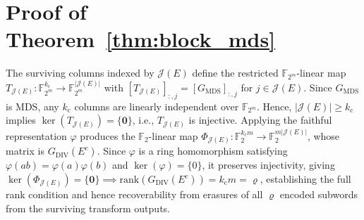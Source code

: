 \documentclass[journal]{IEEEtran}
\begin{document}
\section{Proof of Theorem~\ref{thm:block_mds}}
\label{app:proof_block_mds}
The surviving columns indexed by $\mathcal{J}(E)$ define the restricted $\mathbb{F}_{2^m}$-linear map $T_{\mathcal{J}(E)}:\mathbb{F}_{2^m}^{k_{\mathrm{c}}}\rightarrow\mathbb{F}_{2^m}^{|\mathcal{J}(E)|}$ with $[T_{\mathcal{J}(E)}]_{:,j}=[G_{\mathrm{MDS}}]_{:,j}$ for $j\in\mathcal{J}(E)$. Since $G_{\mathrm{MDS}}$ is MDS, any $k_{\mathrm{c}}$ columns are linearly independent over $\mathbb{F}_{2^m}$. Hence, $|\mathcal{J}(E)|\geq k_{\mathrm{c}}$ implies $\ker(T_{\mathcal{J}(E)})=\{\mathbf{0}\}$, i.e., $T_{\mathcal{J}(E)}$ is injective. Applying the faithful representation $\varphi$ produces the $\mathbb{F}_2$-linear map $\Phi_{\mathcal{J}(E)}:\mathbb{F}_2^{k_{\mathrm{c}} m}\rightarrow\mathbb{F}_2^{m|\mathcal{J}(E)|}$, whose matrix is $G_{\mathrm{DIV}}(E^c)$. Since $\varphi$ is a ring homomorphism satisfying $\varphi(ab)=\varphi(a)\varphi(b)$ and $\ker(\varphi)=\{0\}$, it preserves injectivity, giving $\ker\!\left(\Phi_{\mathcal{J}(E)}\right)=\{\mathbf{0}\}\implies\mathrm{rank}\!\left(G_{\mathrm{DIV}}(E^c)\right)=k_{\mathrm{c}}m=\varrho$, establishing the full rank condition and hence recoverability from erasures of all $\varrho$ encoded subwords from the surviving transform outputs.
\end{document}
